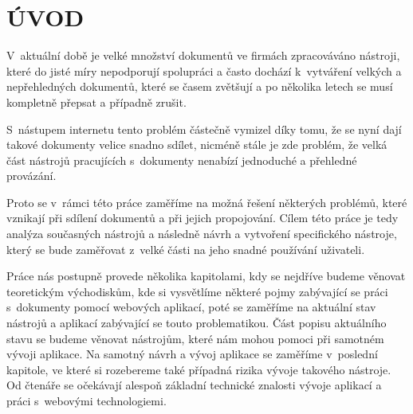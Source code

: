 \chapter*{ÚVOD}
\par V~aktuální době je velké množství dokumentů ve firmách zpracováváno nástroji, které do jisté míry nepodporují spolupráci a často dochází k~vytváření velkých a nepřehledných dokumentů, které se časem zvětšují a po několika letech se musí kompletně přepsat a případně zrušit.

\par S~nástupem internetu tento problém částečně vymizel díky tomu, že se nyní dají takové dokumenty velice snadno sdílet, nicméně stále je zde problém, že velká část nástrojů pracujících s~dokumenty nenabízí jednoduché a přehledné provázání.

\par Proto se v~rámci této práce zaměříme na možná řešení některých problémů, které vznikají při sdílení dokumentů a při jejich propojování. Cílem této práce je tedy analýza současných nástrojů a následně návrh a vytvoření specifického nástroje, který se bude zaměřovat z~velké části na jeho snadné používání uživateli.

\par Práce nás postupně provede několika kapitolami, kdy se nejdříve budeme věnovat teoretickým východiskům, kde si vysvětlíme některé pojmy zabývající se práci s~dokumenty pomocí webových aplikací, poté se zaměříme na aktuální stav nástrojů a aplikací zabývající se touto problematikou. Část popisu aktuálního stavu se budeme věnovat nástrojům, které nám mohou pomoci při samotném vývoji aplikace. Na samotný návrh a vývoj aplikace se zaměříme v~poslední kapitole, ve které si rozebereme také případná rizika vývoje takového nástroje. Od čtenáře se očekávají alespoň základní technické znalosti vývoje aplikací a práci s~webovými technologiemi.


